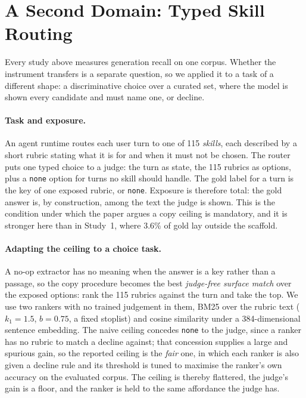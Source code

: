 \section{A Second Domain: Typed Skill Routing}\label{sec:routing}
Every study above measures generation recall on one corpus. Whether the instrument transfers is a separate question, so we applied it to a task of a different shape: a discriminative choice over a curated set, where the model is shown every candidate and must name one, or decline.

\paragraph{Task and exposure.} An agent runtime routes each user turn to one of 115 \emph{skills}, each described by a short rubric stating what it is for and when it must not be chosen. The router puts one typed choice to a judge: the turn as state, the 115 rubrics as options, plus a \texttt{none} option for turns no skill should handle. The gold label for a turn is the key of one exposed rubric, or \texttt{none}. Exposure is therefore total: the gold answer is, by construction, among the text the judge is shown. This is the condition under which the paper argues a copy ceiling is mandatory, and it is stronger here than in Study~1, where $3.6\%$ of gold lay outside the scaffold.

\paragraph{Adapting the ceiling to a choice task.} A no-op extractor has no meaning when the answer is a key rather than a passage, so the copy procedure becomes the best \emph{judge-free surface match} over the exposed options: rank the 115 rubrics against the turn and take the top. We use two rankers with no trained judgement in them, BM25 over the rubric text ($k_1{=}1.5$, $b{=}0.75$, a fixed stoplist) and cosine similarity under a 384-dimensional sentence embedding. The naive ceiling concedes \texttt{none} to the judge, since a ranker has no rubric to match a decline against; that concession supplies a large and spurious gain, so the reported ceiling is the \emph{fair} one, in which each ranker is also given a decline rule and its threshold is tuned to maximise the ranker's own accuracy on the evaluated corpus. The ceiling is thereby flattered, the judge's gain is a floor, and the ranker is held to the same affordance the judge has.

